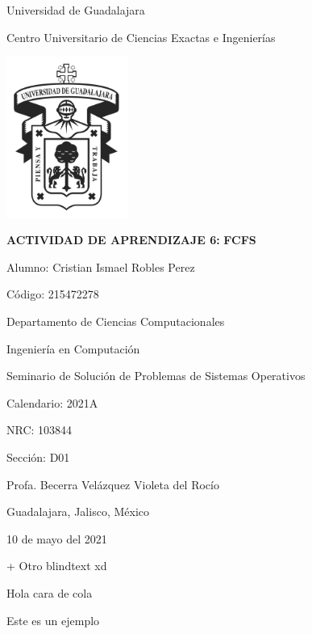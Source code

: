 \documentclass[12pt, oneside]{article}
\title{\tiText}
\newcommand{\code}{215472278}
\newcommand{\calendar}{2021A}
\newcommand{\nrc}{103844}
\newcommand{\signSec}{D01}
\newcommand{\profName}{Profa. Becerra Velázquez Violeta del Rocío}
\newcommand{\actTitle}{FCFS}
\newcommand{\actNum}{ACTIVIDAD DE APRENDIZAJE 6:}
\newcommand{\myName}{Cristian Ismael Robles Perez}
\newcommand{\sign}{Seminario de Solución de Problemas de Sistemas Operativos}
\begin{document}
\begingroup
    \noindent
    \fontsize{18pt}{18pt}\selectfont
    \begin{center}
        Universidad de Guadalajara

        Centro Universitario de Ciencias Exactas e Ingenierías

        \includegraphics[width=150px]{imgs/logo_udg.png}
    \end{center}
\endgroup

\begingroup
    \fontsize{16pt}{16pt}\selectfont
    \begin{center}
        \textbf{\actNum}
        \textbf{\actTitle} \newline
    \end{center}
\endgroup

\begingroup
\fontsize{14pt}{14pt}\selectfont
        \noindent
        Alumno: \myName

        \noindent
        Código: \code \newline

        \noindent
        Departamento de Ciencias Computacionales

        \noindent
        Ingeniería en Computación

        \noindent
        \sign

        \noindent
        Calendario: \calendar

        \noindent
        NRC: \nrc

        \noindent
        Sección: \signSec

        \noindent
        \profName \newline \break

        \begin{flushright}
            Guadalajara, Jalisco, México

            10 de mayo del 2021
        \end{flushright}
\endgroup


\newpage

\blindtext


\blindtext


\blindtext
\newpage

\blindtext
\blindtext
\blindtext
\blindtext
\blindtext
\blindtext
\blindtext

\blindtext
\blindtext

\blindtext

\blindtext
+
Otro blindtext xd

\blindtext

Hola cara de cola

\blindtext

Este es un ejemplo

\blindtext
\end{document}
